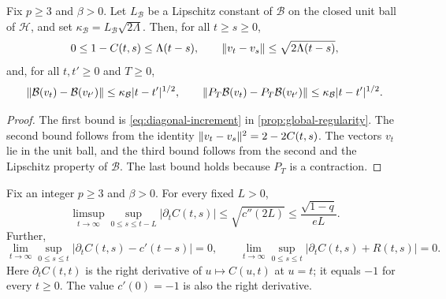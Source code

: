 \begin{lemma}\label{lem:resp-drift-holder}
Fix $p\ge3$ and $\beta>0$. Let $L_{\mathcal B}$ be a Lipschitz constant of $\mathcal B$ on the closed unit ball of $\mathcal H$, and set $\kappa_{\mathcal B}=L_{\mathcal B}\sqrt{2\Lambda}$. Then, for all $t\ge s\ge0$,
\[
 0\le1-C(t,s)\le\Lambda(t-s),\qquad \lVert v_t-v_s\rVert\le\sqrt{2\Lambda(t-s)},
\]
and, for all $t,t'\ge0$ and $T\ge0$,
\[
 \lVert\mathcal B(v_t)-\mathcal B(v_{t'})\rVert\le\kappa_{\mathcal B}|t-t'|^{1/2},
 \qquad
 \lVert P_T\mathcal B(v_t)-P_T\mathcal B(v_{t'})\rVert\le\kappa_{\mathcal B}|t-t'|^{1/2}.
\]
\end{lemma}

\begin{proof}
The first bound is \eqref{eq:diagonal-increment} in \cref{prop:global-regularity}. The second bound follows from the identity $\lVert v_t-v_s\rVert^2=2-2C(t,s)$. The vectors $v_t$ lie in the unit ball, and the third bound follows from the second and the Lipschitz property of $\mathcal B$. The last bound holds because $P_T$ is a contraction.
\end{proof}

\begin{theorem}
\label{resp:forward-derivative}
Fix an integer $p\ge3$ and $\beta>0$. For every fixed $L>0$,
\begin{equation}
 \limsup_{t\to\infty}\sup_{0\le s\le t-L}
 |\partial_tC(t,s)|\le\sqrt{c''(2L)}
 \le\frac{\sqrt{1-q}}{eL}.
 \label{resp:remote-forward}
\end{equation}
Further,
\begin{equation}
 \lim_{t\to\infty}\sup_{0\le s\le t}|\partial_tC(t,s)-c'(t-s)|=0,
 \qquad
 \lim_{t\to\infty}\sup_{0\le s\le t}|\partial_tC(t,s)+R(t,s)|=0.
 \label{resp:uniform-forward-fdt}
\end{equation}
Here $\partial_tC(t,t)$ is the right derivative of $u\mapsto C(u,t)$ at $u=t$; it equals $-1$ for every $t\ge0$. The value $c'(0)=-1$ is also the right derivative.
\end{theorem}

